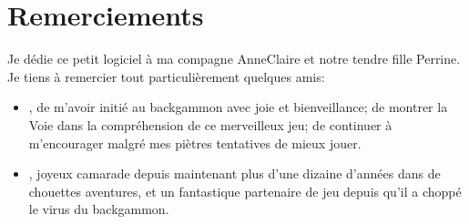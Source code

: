 \documentclass[letterpaper,10pt,french]{sphinxmanual}
\begin{document}
\chapter{Remerciements}
\label{\detokenize{index:remerciements}}
\sphinxAtStartPar
Je dédie ce petit logiciel à ma compagne Anne\sphinxhyphen{}Claire et notre tendre
fille Perrine. Je tiens à remercier tout particulièrement quelques amis:
\begin{itemize}
\item {} 
\sphinxAtStartPar
{}, de m’avoir initié au backgammon avec joie et
bienveillance; de montrer la Voie dans la compréhension de ce
merveilleux jeu; de continuer à m’encourager malgré mes piètres
tentatives de mieux jouer.

\item {} 
\sphinxAtStartPar
{}, joyeux camarade depuis maintenant plus d’une dizaine
d’années dans de chouettes aventures, et un fantastique partenaire de jeu
depuis qu’il a choppé le virus du backgammon.

\end{itemize}



\renewcommand{\indexname}{Index}
\printindex
\end{document}
